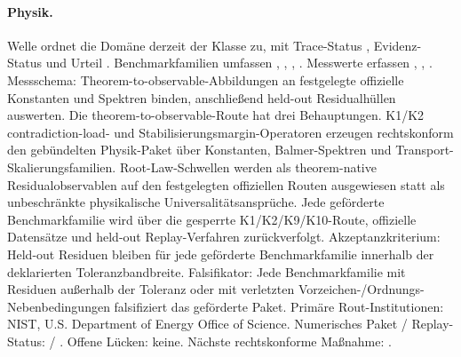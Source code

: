 \paragraph{Physik.}
Welle  ordnet die Domäne derzeit der Klasse  zu, mit Trace-Status , Evidenz-Status  und Urteil .
Benchmarkfamilien umfassen , \allowbreak {}, \allowbreak {}, \allowbreak {}.
Messwerte erfassen , \allowbreak {}, \allowbreak {}.
Messschema: Theorem-to-observable-Abbildungen an festgelegte offizielle Konstanten und Spektren binden, anschließend held-out Residualhüllen auswerten.
Die theorem-to-observable-Route hat drei Behauptungen. K1/K2 contradiction-load- und Stabilisierungsmargin-Operatoren erzeugen rechtskonform den gebündelten Physik-Paket über Konstanten, Balmer-Spektren und Transport-Skalierungsfamilien. Root-Law-Schwellen werden als theorem-native Residualobservablen auf den festgelegten offiziellen Routen ausgewiesen statt als unbeschränkte physikalische Universalitätsansprüche. Jede geförderte Benchmarkfamilie wird über die gesperrte K1/K2/K9/K10-Route, offizielle Datensätze und held-out Replay-Verfahren zurückverfolgt.
Akzeptanzkriterium: Held-out Residuen bleiben für jede geförderte Benchmarkfamilie innerhalb der deklarierten Toleranzbandbreite.
Falsifikator: Jede Benchmarkfamilie mit Residuen außerhalb der Toleranz oder mit verletzten Vorzeichen-/Ordnungs-Nebenbedingungen falsifiziert das geförderte Paket.
Primäre Rout-Institutionen: NIST, \allowbreak U.S. Department of Energy Office of Science.
Numerisches Paket / Replay-Status:  / .
Offene Lücken: keine.
Nächste rechtskonforme Maßnahme: .

